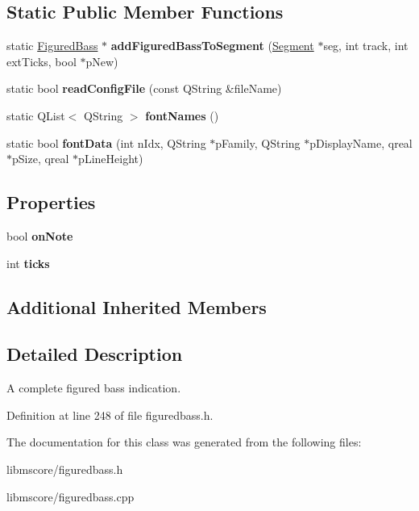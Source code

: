 \subsection*{Static Public Member Functions}
\begin{DoxyCompactItemize}
\item 
\mbox{\label{class_ms_1_1_figured_bass_a948a127db2ff8065e98810423cead6c1}} 
static \hyperlink{class_ms_1_1_figured_bass}{Figured\+Bass} $\ast$ {\bfseries add\+Figured\+Bass\+To\+Segment} (\hyperlink{class_ms_1_1_segment}{Segment} $\ast$seg, int track, int ext\+Ticks, bool $\ast$p\+New)
\item 
\mbox{\label{class_ms_1_1_figured_bass_a1a6c0b4161f643f2fe328d386dbfad61}} 
static bool {\bfseries read\+Config\+File} (const Q\+String \&file\+Name)
\item 
\mbox{\label{class_ms_1_1_figured_bass_a3049146068d28bc3b781829fe05d6f3a}} 
static Q\+List$<$ Q\+String $>$ {\bfseries font\+Names} ()
\item 
\mbox{\label{class_ms_1_1_figured_bass_a450b9f913aaa9774b8a3edccc993657b}} 
static bool {\bfseries font\+Data} (int n\+Idx, Q\+String $\ast$p\+Family, Q\+String $\ast$p\+Display\+Name, qreal $\ast$p\+Size, qreal $\ast$p\+Line\+Height)
\end{DoxyCompactItemize}
\subsection*{Properties}
\begin{DoxyCompactItemize}
\item 
\mbox{\label{class_ms_1_1_figured_bass_a76f873df2672b1e5bc2fcb7e99539124}} 
bool {\bfseries on\+Note}
\item 
\mbox{\label{class_ms_1_1_figured_bass_af74b8611c9214991a73c05dea4f44b2d}} 
int {\bfseries ticks}
\end{DoxyCompactItemize}
\subsection*{Additional Inherited Members}


\subsection{Detailed Description}
A complete figured bass indication. 

Definition at line 248 of file figuredbass.\+h.



The documentation for this class was generated from the following files\+:\begin{DoxyCompactItemize}
\item 
libmscore/figuredbass.\+h\item 
libmscore/figuredbass.\+cpp\end{DoxyCompactItemize}
